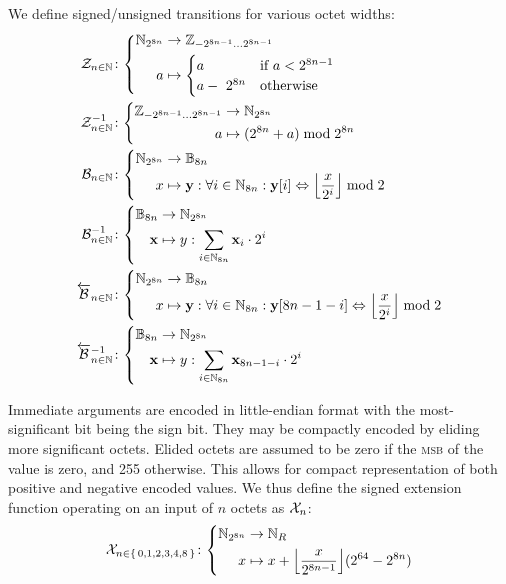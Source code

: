 We define signed/unsigned transitions for various octet widths:
\begin{align}
  \label{eq:signedfunc}
  \signfunc{n \in \N}&\colon\abracegroup{
    \Nbits{8n} &\to \Z_{-2^{8n-1}\dots2^{8n-1}}\\
    a &\mapsto \begin{cases}
      a &\when a < 2^{8n-1} \\
      a -\ 2^{8n} &\otherwise
    \end{cases}
  }\\
  \unsignfunc{n \in \N}&\colon\abracegroup{
    \Z_{-2^{8n-1}\dots2^{8n-1}} &\to \Nbits{8n}\\
    a &\mapsto (2^{8n} + a) \bmod 2^{8n}
  }\\
  \label{eq:bitsfunc}
  \bitsfunc{n\in\N}&\colon\abracegroup{
    \Nbits{8n} &\to \mathbb{B}_{8n}\\
    x &\mapsto \mathbf{y}: \forall i \in \Nmax{8n} : \mathbf{y}[i] \Leftrightarrow \ffrac{x}{2^i}\bmod 2
  }\\
  \unbitsfunc{n\in\N}&\colon\abracegroup{
    \mathbb{B}_{8n} &\to \Nbits{8n}\\
    \mathbf{x} &\mapsto y: \sum_{i \in \Nmax{8n}} \mathbf{x}_i \cdot 2^i
  }\\
  \label{eq:revbitsfunc}
  \revbitsfunc{n\in\N}&\colon\abracegroup{
    \Nbits{8n} &\to \mathbb{B}_{8n}\\
    x &\mapsto \mathbf{y}: \forall i \in \Nmax{8n} : \mathbf{y}[8n - 1 - i] \Leftrightarrow \ffrac{x}{2^i}\bmod 2
  }\\
  \revunbitsfunc{n\in\N}&\colon\abracegroup{
    \mathbb{B}_{8n} &\to \Nbits{8n}\\
    \mathbf{x} &\mapsto y: \sum_{i \in \Nmax{8n}} \mathbf{x}_{8n - 1 - i} \cdot 2^i
  }
\end{align}

Immediate arguments are encoded in little-endian format with the most-significant bit being the sign bit. They may be compactly encoded by eliding more significant octets. Elided octets are assumed to be zero if the \textsc{msb} of the value is zero, and 255 otherwise. This allows for compact representation of both positive and negative encoded values. We thus define the signed extension function operating on an input of $n$ octets as $\mathcal{X}_n$:
\begin{align}\label{eq:signedextension}
  \sext_{n \in \set{0, 1, 2, 3, 4, 8}}\colon\abracegroup{
    \Nbits{8n} &\to \pvmreg\\
    x &\mapsto x + \ffrac{x}{2^{8n-1}}(2^{64}-2^{8n})
  }
\end{align}

